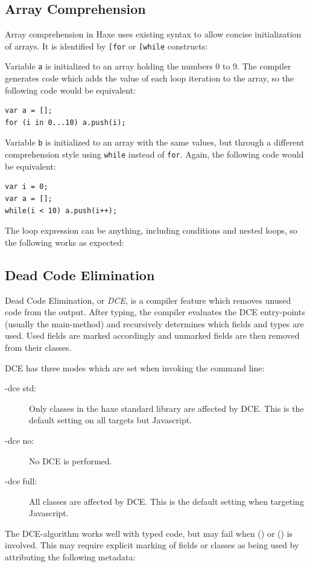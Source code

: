 \documentclass{article}
\newcommand{\target}[1]{#1}
\newcommand{\expr}[1]{\texttt{#1}}
\newcommand{\Fullref}[1]{\nameref{#1} (\Cref{#1})}
\begin{document}
\subsection{Array Comprehension}
\label{Array Comprehension}

Array comprehension in Haxe uses existing syntax to allow concise initialization of arrays. It is identified by \expr{[for} or \expr{[while} constructs:



Variable \expr{a} is initialized to an array holding the numbers 0 to 9. The compiler generates code which adds the value of each loop iteration to the array, so the following code would be equivalent:

\begin{lstlisting}
var a = [];
for (i in 0...10) a.push(i);
\end{lstlisting}

Variable \expr{b} is initialized to an array with the same values, but through a different comprehension style using \expr{while} instead of \expr{for}. Again, the following code would be equivalent:

\begin{lstlisting}
var i = 0;
var a = [];
while(i < 10) a.push(i++);
\end{lstlisting}

The loop expression can be anything, including conditions and nested loops, so the following works as expected:






\subsection{Dead Code Elimination}
\label{Dead Code Elimination}

Dead Code Elimination, or \emph{DCE}, is a compiler feature which removes unused code from the output. After typing, the compiler evaluates the DCE entry-points (usually the main-method) and recursively determines which fields and types are used. Used fields are marked accordingly and unmarked fields are then removed from their classes.

DCE has three modes which are set when invoking the command line:

\begin{description}
	\item[-dce std:] Only classes in the haxe standard library are affected by DCE. This is the default setting on all targets but \target{Javascript}.
	\item[-dce no:] No DCE is performed.
	\item[-dce full:] All classes are affected by DCE. This is the default setting when targeting \target{Javascript}.
\end{description}
The DCE-algorithm works well with typed code, but may fail when \Fullref{Dynamic} or \Fullref{Reflection} is involved. This may require explicit marking of fields or classes as being used by attributing the following metadata:
\end{document}
